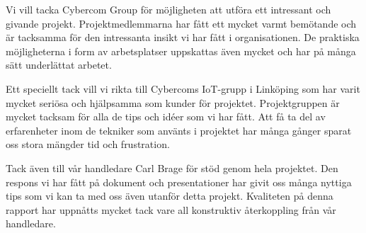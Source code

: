 
Vi vill tacka Cybercom Group för möjligheten att utföra ett intressant och givande projekt. Projektmedlemmarna har fått ett mycket varmt bemötande och är tacksamma för den intressanta insikt vi har fått i organisationen. De praktiska möjligheterna i form av arbetsplatser uppskattas även mycket och har på många sätt underlättat arbetet.

Ett speciellt tack vill vi rikta till Cybercoms IoT-grupp i Linköping som har varit mycket seriösa och hjälpsamma som kunder för projektet. Projektgruppen är mycket tacksam för alla de tips och idéer som vi har fått. Att få ta del av erfarenheter inom de tekniker som använts i projektet har många gånger sparat oss stora mängder tid och frustration.

Tack även till vår handledare Carl Brage för stöd genom hela projektet. Den respons vi har fått på dokument och presentationer har givit oss många nyttiga tips som vi kan ta med oss även utanför detta projekt. Kvaliteten på denna rapport har uppnåtts mycket tack vare all konstruktiv återkoppling från vår handledare.
